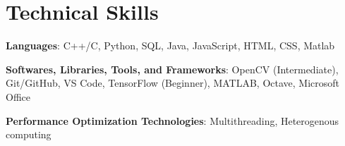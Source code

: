 \documentclass[letterpaper,11pt]{article}
\begin{document}
\section{Technical Skills}
 \begin{itemize}[leftmargin=0.15in, label={}]
    \small{\item{
     \textbf{Languages}{: C++/C, Python, SQL, Java, JavaScript, HTML, CSS, Matlab} \\ \vspace{3pt}
 
     \textbf{Softwares, Libraries, Tools, and Frameworks}{: OpenCV (Intermediate), Git/GitHub, VS Code, TensorFlow (Beginner), MATLAB, Octave, Microsoft Office}

      \textbf{Performance Optimization Technologies}{: Multithreading, Heterogenous computing}\\ \vspace{3pt}
    }}
 \end{itemize}



  
  
\end{document}
